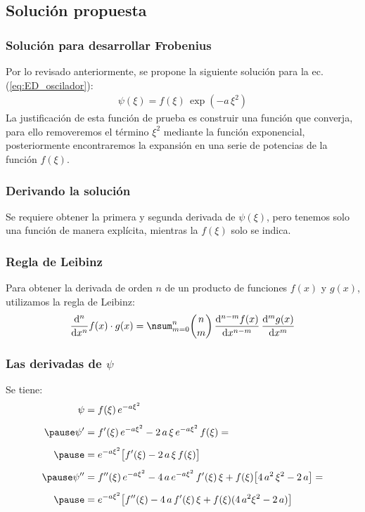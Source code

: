 \documentclass[12pt]{beamer}
\begin{document}
\subsection{Solución propuesta}

\begin{frame}
\frametitle{Solución para desarrollar Frobenius}
Por lo revisado anteriormente, se propone la siguiente solución para la ec. (\ref{eq:ED_oscilador}):
\pause
\begin{align*}
\psi (\xi) = f (\xi) \, \exp \left( - a \, \xi^{2} \right) 
\end{align*}
\pause
La justificación de esta función de prueba es construir una función que converja, para ello removeremos el término $\xi^{2}$ mediante la función exponencial, posteriormente encontraremos la expansión en una serie de potencias de la función $f(\xi)$.
\end{frame}
\begin{frame}
\frametitle{Derivando la solución}
Se requiere obtener la primera y segunda derivada de $\psi(\xi)$, pero tenemos solo una función de manera explícita, mientras la $f(\xi)$ solo se indica.
\end{frame}
\begin{frame}
\frametitle{Regla de Leibinz}
Para obtener la derivada de orden $n$ de un producto de funciones $f(x)$ y $g(x)$, utilizamos la regla de Leibinz:
\pause
\begin{align*}
\dv[n]{x} f(x) \cdot g(x) = \nsum_{m=0}^{n} \binom{n}{m} \, \dv[n-m]{f(x)}{x}  \, \dv[m]{g(x)}{x}
\end{align*}
\end{frame}
\begin{frame}\frametitle{Las derivadas de $\psi$}
Se tiene:
\pause
\begin{eqnarray*}
\begin{aligned}
\psi &= f(\xi) \, e^{-a \xi^{2}} \\[0.5em] \pause
\ptilde{\psi} &= \ptilde{f}(\xi) \, e^{-a \xi^{2}} - 2 \, a \, \xi  \, e^{-a \xi^{2}} \, f(\xi) = \\[0.5em] \pause
&= e^{-a \xi^{2}} \big[ \ptilde{f}(\xi) -  2 \, a \, \xi \, f(\xi) \big] \\[0.5em] \pause
\stilde{\psi} &= \stilde{f}(\xi) \, e^{-a \xi^{2}} - 4 \, a \, e^{-a \xi^{2}} \, \ptilde{f}(\xi) \, \xi + f(\xi) \big[ 4 \, a^{2} \, \xi^{2} - 2 \, a \big] = \\[0.5em] \pause
&= e^{-a \xi^{2}} \big[ \stilde{f}(\xi) - 4 \, a \, \ptilde{f}(\xi) \, \xi + f(\xi) (4 \, a^{2} \xi^{2} - 2 \, a) \big]
\end{aligned}
\end{eqnarray*}    
\end{frame}
\end{document}
